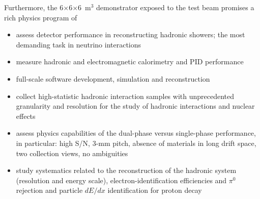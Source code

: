 {Furthermore, the 6$\times$6$\times$6~m$^3$ demonstrator exposed to the
test beam promises a rich physics program of
\begin{itemize}
\item{assess detector performance in reconstructing hadronic showers; the most demanding task in neutrino interactions}
\item{measure hadronic and electromagnetic calorimetry and PID performance}
\item{full-scale software development, simulation and reconstruction}
\item{collect high-statistic hadronic interaction samples with unprecedented granularity and resolution for the study of hadronic interactions and nuclear effects}
\item{assess physics capabilities of the dual-phase versus
  single-phase performance, in particular: high S/N, 3-mm pitch,
  absence of materials in long drift space, two collection views, no
  ambiguities}
\item{study systematics related to
  the reconstruction of the hadronic system (resolution and energy
  scale), electron-identification efficiencies and $\pi^0$ rejection and particle $dE/dx$ identification for proton decay}
\end{itemize}



}
